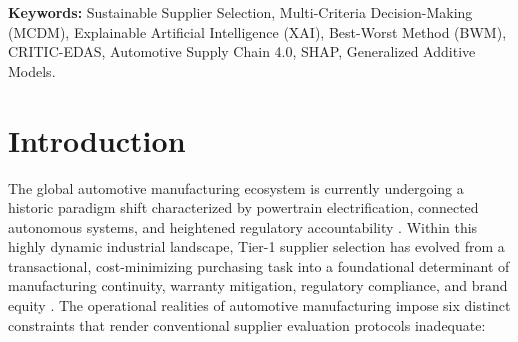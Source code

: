 \documentclass[twocolumn,10pt]{article}
\begin{document}
\vspace{0.8em}
\noindent\textbf{Keywords:} Sustainable Supplier Selection, Multi-Criteria Decision-Making (MCDM), Explainable Artificial Intelligence (XAI), Best-Worst Method (BWM), CRITIC-EDAS, Automotive Supply Chain 4.0, SHAP, Generalized Additive Models.

\section{Introduction}
\label{sec:intro}

The global automotive manufacturing ecosystem is currently undergoing a historic paradigm shift characterized by powertrain electrification, connected autonomous systems, and heightened regulatory accountability \cite{rezaei2016supplier, debnath2024automotive}. Within this highly dynamic industrial landscape, Tier-1 supplier selection has evolved from a transactional, cost-minimizing purchasing task into a foundational determinant of manufacturing continuity, warranty mitigation, regulatory compliance, and brand equity \cite{kannan2020sustainable}. The operational realities of automotive manufacturing impose six distinct constraints that render conventional supplier evaluation protocols inadequate:
\end{document}
